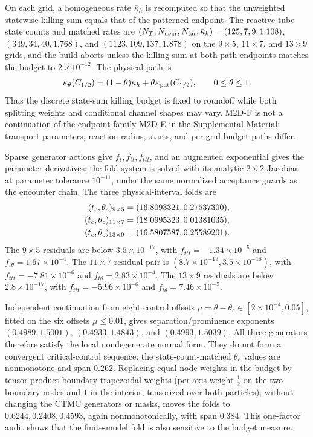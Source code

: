 \documentclass[aps,pre,reprint,amsmath,amssymb,longbibliography,floatfix]{revtex4-2}
\begin{document}
On each grid, a homogeneous rate \(\bar\kappa_h\) is recomputed so that the
unweighted statewise killing sum equals that of the patterned endpoint. The
reactive-tube state counts and matched rates are
\((N_T,N_{\rm near},N_{\rm far},\bar\kappa_h)=(125,7,9,1.108)\),
\((349,34,40,1.768)\), and \((1123,109,137,1.878)\) on the
\(9\times5\), \(11\times7\), and \(13\times9\) grids, and the build
aborts unless the killing sum at both path endpoints matches the budget to
\(2\times10^{-12}\). The
physical path is
\begin{equation}
\kappa_\theta(C_{1/2})=(1-\theta)\bar\kappa_h
+\theta\kappa_{\rm pat}(C_{1/2}),
\qquad 0\leq\theta\leq1.
\label{eq:2d-budget-path}
\end{equation}
Thus the discrete state-sum killing budget is fixed to roundoff while both
splitting weights and conditional channel shapes may vary. M2D-F is not a
continuation of the endpoint family M2D-E in the Supplemental Material:
transport parameters, reaction radius, starts, and per-grid budget paths
differ.

Sparse generator actions give \(f_t,f_{tt},f_{ttt}\), and an augmented
exponential gives the parameter derivatives; the fold system is solved with
its analytic \(2\times2\) Jacobian at parameter tolerance \(10^{-11}\),
under the same normalized acceptance guards as the encounter chain. The three physical-interval
folds are
\begin{align}
(t_c,\theta_c)_{9\times5}&=(16.8093321,0.27537300),\notag\\
(t_c,\theta_c)_{11\times7}&=(18.0995323,0.01381035),\notag\\
(t_c,\theta_c)_{13\times9}&=(16.5807587,0.25589201).
\label{eq:2d-folds}
\end{align}
The \(9\times5\) residuals are below \(3.5\times10^{-17}\), with
\(f_{ttt}=-1.34\times10^{-5}\) and
\(f_{t\theta}=1.67\times10^{-4}\). The \(11\times7\) residual pair is
\((8.7\times10^{-19},3.5\times10^{-18})\), with
\(f_{ttt}=-7.81\times10^{-6}\) and
\(f_{t\theta}=2.83\times10^{-4}\). The \(13\times9\) residuals are below
\(2.8\times10^{-17}\), with \(f_{ttt}=-5.96\times10^{-6}\) and
\(f_{t\theta}=7.46\times10^{-5}\).

Independent continuation from eight control offsets
\(\mu=\theta-\theta_c\in[2\times10^{-4},0.05]\), fitted on the six
offsets \(\mu\le0.01\), gives separation/prominence exponents
\((0.4989,1.5001)\), \((0.4933,1.4843)\), and
\((0.4993,1.5039)\). All three generators therefore satisfy the local
nondegenerate normal form. They do not form a convergent critical-control
sequence: the state-count-matched \(\theta_c\) values are nonmonotone and span
\(0.262\). Replacing equal node weights in the budget by tensor-product
boundary trapezoidal weights (per-axis weight \(\tfrac12\) on the two
boundary nodes and \(1\) in the interior, tensorized over both particles),
without changing the CTMC generators or masks,
moves the folds to \(0.6244,0.2408,0.4593\), again nonmonotonically, with span
\(0.384\). This one-factor audit shows that the finite-model fold is also
sensitive to the budget measure.
\end{document}
